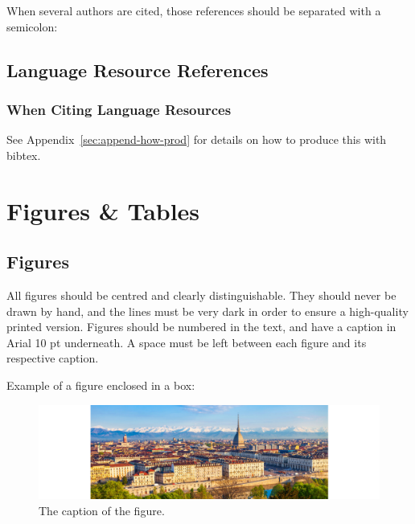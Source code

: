 \documentclass[10pt, a4paper]{article}
\begin{document}
When several authors are cited, those references should be separated with a semicolon: %

\subsection{Language Resource References}

\subsubsection{When Citing Language Resources}


See Appendix~\ref{sec:append-how-prod} for details on how to produce this with bibtex.

\section{Figures \& Tables}

\subsection{Figures}

All figures should be centred and clearly distinguishable. They should never be drawn by hand, and the lines must be very dark in order to ensure a high-quality printed version. Figures should be numbered in the text, and have a caption in Arial 10 pt underneath. A space must be left between each figure and its respective caption. 

Example of a figure enclosed in a box:

\begin{figure}[!ht]
\begin{center}
\includegraphics[scale=0.5]{turin2024-banner.jpg} 
\caption{The caption of the figure.}%
\label{fig.1}
\end{center}
\end{figure}
\end{document}
